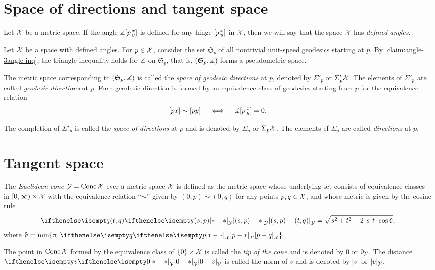 \section{Space of directions and tangent space}
\label{sec:tangent-space+directions}

Let $\mathcal{X}$ be a metric space.
If the angle $\measuredangle[p\,{}^{x}_{y}]$ is defined for any hinge $[p\,{}^{x}_{y}]$ in $\mathcal{X}$,
then we will say that the space $\mathcal{X}$ has \emph{defined angles}.

 
Let $\mathcal{X}$ be a space with defined angles. For $p\in \spc{X}$,
consider the set $\mathfrak{S}_p$ 
of all nontrivial unit-speed geodesics starting at $p$.
By \ref{claim:angle-3angle-inq}, the triangle inequality holds for $\measuredangle$ on $\mathfrak{S}_p$,
that is, $(\mathfrak{S}_p,\measuredangle)$ 
forms a pseudometric space.

The metric space corresponding to  $(\mathfrak{S}_p,\measuredangle)$ is called the \emph{space of geodesic directions} at $p$, denoted by $\Sigma'_p$ or $\Sigma'_p\mathcal{X}$.
The elements of $\Sigma'_p$ are called \emph{geodesic directions} at $p$.
Each geodesic direction is formed by an equivalence class of geodesics starting from $p$ 
for the equivalence relation 
\[[px]\sim[py]\quad \iff\quad \measuredangle[p\,{}^{x}_{y}]=0.\]



The completion of $\Sigma'_p$ is called the \emph{space of directions} at $p$ and is denoted by $\Sigma_p$ or $\Sigma_p\mathcal{X}$.
The elements of $\Sigma_p$ are called \emph{directions} at $p$.

\section{Tangent space}

The \emph{
Euclidean cone} $\mathcal{Y}=\mathop{\rm Cone}\nolimits\mathcal{X}$ 
over a metric space $\mathcal{X}$
is defined as the metric space whose underlying set consists of
equivalence classes in
$[0,\infty)\times \spc{X}$ with the equivalence relation ``$\sim$'' given by $(0,p)\sim (0,q)$ for any points $p,q\in\spc{X}$,
and whose metric is given by the cosine rule
\[
\dist{(s,p)}{(t,q)}{\spc{Y}} 
=
\sqrt{s^2+t^2-2\cdot s\cdot t\cdot \cos\theta},
\]
where $\theta= \min\{\pi, \dist{p}{q}{\spc{X}}\}$.

The point in  $\mathop{\rm Cone}\nolimits{\mathcal{X}}$ formed by the equivalence class of $\{0\}\times\spc{X}$ is called the \emph{tip of the cone} and is denoted by $0$ or $0_{\mathcal{Y}}$.
The distance $\dist{0}{v}{\spc{Y}}$ is called the norm of $v$ and is denoted by $|v|$ or $|v|_{\mathcal{Y}}$.


